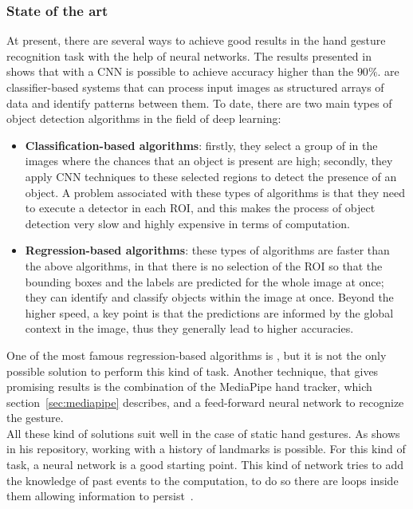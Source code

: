 \documentclass[../thesis.tex]{subfiles}
\begin{document}
\subsubsection{State of the art}
At present, there are several ways to achieve good results in the hand gesture recognition task with the help of neural networks. The results presented in~\citeauthor{article:survey_on_vision_based_hand_gesture_recognition}~\cite{article:survey_on_vision_based_hand_gesture_recognition} shows that with a \acrfull{CNN} is possible to achieve accuracy higher than the $90\%$.  are classifier-based systems that can process input images as structured arrays of data and identify patterns between them. To date, there are two main types of object detection algorithms in the field of deep learning:
\begin{itemize}
    \item \textbf{Classification-based algorithms}: firstly, they select a group of  in the images where the chances that an object is present are high; secondly, they apply \acrshort{CNN} techniques to these selected regions to detect the presence of an object. A problem associated with these types of algorithms is that they need to execute a detector in each \acrshort{ROI}, and this makes the process of object detection very slow and highly expensive in terms of computation.
    \item \textbf{Regression-based algorithms}: these types of algorithms are faster than the above algorithms, in that there is no selection of the \acrshort{ROI} so that the bounding boxes and the labels are predicted for the whole image at once; they can identify and classify objects within the image at once. Beyond the higher speed, a key point is that the predictions are informed by the global context in the image, thus they generally lead to higher accuracies.
\end{itemize}
One of the most famous regression-based algorithms is , but it is not the only possible solution to perform this kind of task. Another technique, that gives promising results is the combination of the MediaPipe hand tracker, which section~\ref{sec:mediapipe} describes, and a feed-forward neural network to recognize the gesture.\\
All these kind of solutions suit well in the case of static hand gestures. As \citeauthor{site:hand_gesture_base_repo} shows in his repository\cite{site:hand_gesture_base_repo}, working with a history of landmarks is possible. For this kind of task, a  neural network is a good starting point. This kind of network tries to add the knowledge of past events to the computation, to do so there are loops inside them allowing information to persist~\cite{site:understanding_lstm_networks}.
\end{document}

